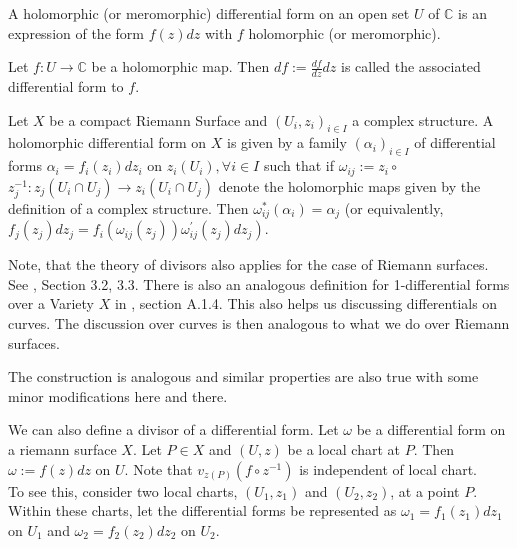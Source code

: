 \begin{definition}
    A holomorphic (or meromorphic) differential form on an open set $U$ of $\mathbb{C}$ is an expression of the form $f(z) d z$ with $f$ holomorphic (or meromorphic).
\end{definition}

\begin{definition}
    Let $f: U \longrightarrow \mathbb{C}$ be a holomorphic map. Then $d f:=\frac{d f}{d z} d z$ is called the associated differential form to $f$.

\end{definition}

\begin{definition}
    Let $X$ be a compact Riemann Surface and $\left(U_{i}, z_{i}\right)_{i \in I}$ a complex structure. A holomorphic differential form on $X$ is given by a family $\left(\alpha_{i}\right)_{i \in I}$ of differential forms $\alpha_{i}=f_{i}\left(z_{i}\right) d z_{i}$ on $z_{i}\left(U_{i}\right), \forall i \in I$ such that if $\omega_{i j}:=z_{i} \circ$ $z_{j}^{-1}: z_{j}\left(U_{i} \cap U_{j}\right) \rightarrow z_{i}\left(U_{i} \cap U_{j}\right)$ denote the holomorphic maps given by
the definition of a complex structure. Then $\omega_{i j}^{*}\left(\alpha_{i}\right)=\alpha_{j}$ (or equivalently, $\left.f_{j}\left(z_{j}\right) d z_{j}=f_{i}\left(\omega_{i j}\left(z_{j}\right)\right) \omega_{i j}^{\prime}\left(z_{j}\right) d z_{j}\right)$.

\end{definition}

Note, that the theory of divisors also applies for the case of Riemann surfaces. See \cite{diamond2005first}, Section 3.2, 3.3. There is also an analogous definition for 1-differential forms over a Variety $X$ in \cite{hindry-silverman-diophantine}, section A.1.4. This also helps us discussing differentials on curves. The discussion over curves is then analogous to what we do over Riemann surfaces. 


The construction is analogous and similar properties are also true with some minor modifications here and there. 

We can also define a divisor of a differential form. 
Let $\omega$ be a differential form on a riemann surface $X$. Let $P \in X$ and $(U, z)$ be a local chart at $P$. Then $\omega:=f(z) d z$ on $U$. Note that $v_{z(P)}(f\circ z^{-1})$ is independent of local chart.\\

To see this, consider two local charts, \( (U_1, z_1) \) and \( (U_2, z_2) \), at a point \( P \). Within these charts, let the differential forms be represented as \( \omega_1 = f_1(z_1)dz_1 \) on \( U_1 \) and \( \omega_2 = f_2(z_2)dz_2 \) on \( U_2 \).

